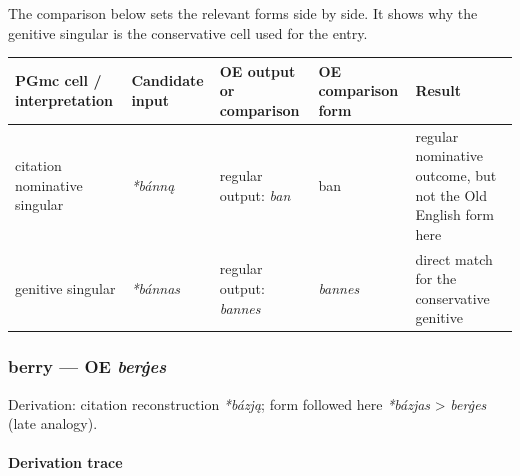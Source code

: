 \documentclass[
  british,
  a4paper,
]{article}
\newcounter{none} %
\begin{document}
The comparison below sets the relevant forms side by side. It shows why
the genitive singular is the conservative cell used for the entry.

{\def\LTcaptype{none} %
\begin{longtable}[]{@{}
  >{\raggedright\arraybackslash}p{}
  >{\raggedright\arraybackslash}p{}
  >{\raggedright\arraybackslash}p{}
  >{\raggedright\arraybackslash}p{}
  >{\raggedright\arraybackslash}p{}@{}}
\toprule\noalign{}
\begin{minipage}[b]{\linewidth}\raggedright
PGmc cell / interpretation
\end{minipage} & \begin{minipage}[b]{\linewidth}\raggedright
Candidate input
\end{minipage} & \begin{minipage}[b]{\linewidth}\raggedright
OE output or comparison
\end{minipage} & \begin{minipage}[b]{\linewidth}\raggedright
OE comparison form
\end{minipage} & \begin{minipage}[b]{\linewidth}\raggedright
Result
\end{minipage} \\
\midrule\noalign{}
\endhead
\bottomrule\noalign{}
\endlastfoot
citation nominative singular & {\emph{*bánną}} & regular output:
{\emph{ban}} & ban & regular nominative outcome, but not the Old English
form here \\
genitive singular & {\emph{*bánnas}} & regular output: \emph{bannes} &
{\emph{bannes}} & direct match for the conservative genitive \\
\end{longtable}
}

\subsubsection{\texorpdfstring{berry --- OE
\emph{berġes}}{berry --- OE berġes}}\label{berry-oe-berux121es}

Derivation: citation reconstruction \emph{*bázją}; form followed here
\emph{*bázjas} \textgreater{} \emph{berġes} (late analogy).

\paragraph{Derivation trace}\label{derivation-trace-147}
\end{document}
